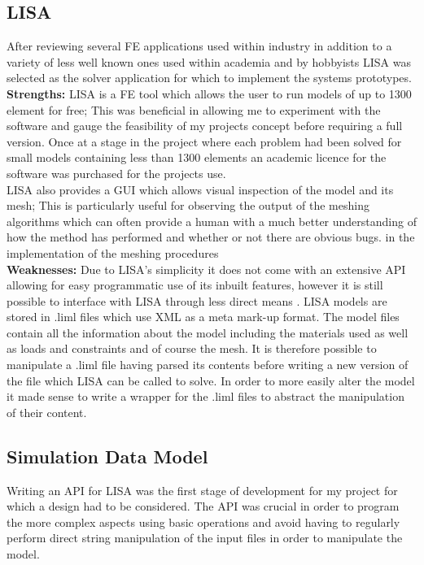\subsection{LISA}
After reviewing several FE applications used within industry in addition to a variety of less well known ones used within academia and by hobbyists LISA  was selected as the solver application for which to implement  the systems prototypes. \\ 

\noindent
\textbf{Strengths: }LISA is a FE tool which allows the user to run models of up to 1300 element for free; This was beneficial in allowing me to experiment with the software and gauge the feasibility of my projects concept before requiring a full version. Once at a stage in the project where each problem had been solved for small models containing less than 1300 elements an academic licence for the software was purchased for the projects use. \\

\noindent
LISA also provides a GUI which allows visual inspection of the model and its mesh; This is particularly useful for observing the output of the meshing algorithms which can often provide a human with a much better understanding of how the method has performed and whether or not there are obvious bugs. in the implementation of the meshing procedures \\ 

\noindent
\textbf{Weaknesses: } Due to LISA’s simplicity it does not come with an extensive API allowing for easy programmatic use of its inbuilt features, however it is still possible to interface with LISA through less direct means \cite{LISAManual}. LISA models are stored in .liml files which use XML as a meta mark-up format. The model files contain all the information about the model including the materials used as well as loads and constraints and of course the mesh. It is therefore possible to manipulate a .liml file having parsed its contents before writing a new version of the file which LISA can be called to solve. In order to more easily alter the model it made sense to write a wrapper  for the .liml files to abstract the manipulation of their content.


\subsection{Simulation Data Model}
Writing an API for LISA was the first stage of development for my project for which a design had to be considered. The API was crucial in order to program the more complex aspects using basic operations and avoid having to regularly perform direct string manipulation of the input files in order to manipulate the model. \\

